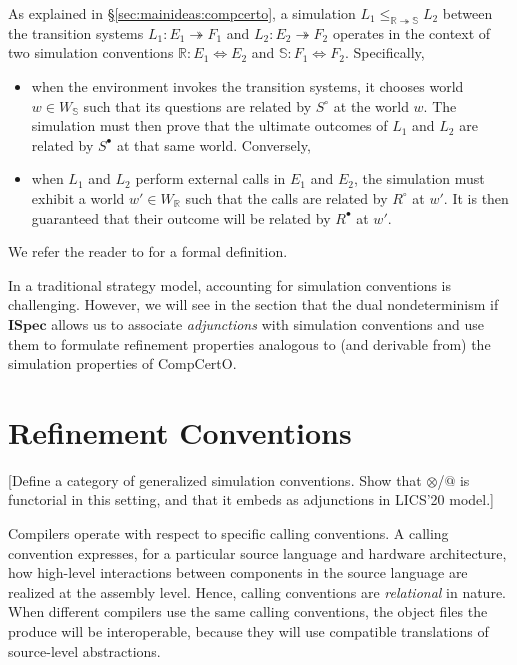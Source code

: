 \documentclass[sigplan,10pt,review,anonymous]{acmart}
\newcommand{\que}{{\circ}}
\newcommand{\ans}{{\bullet}}
\newcommand{\ISpec}{\mathbf{ISpec}}
\begin{document}
As explained in \S\ref{sec:mainideas:compcerto},
a simulation
$L_1 \le_{\mathbb{R} \twoheadrightarrow \mathbb{S}} L_2$
between the transition systems
$L_1 : E_1 \twoheadrightarrow F_1$ and
$L_2 : E_2 \twoheadrightarrow F_2$
operates in the context of two simulation conventions
$\mathbb{R} : E_1 \Leftrightarrow E_2$ and
$\mathbb{S} : F_1 \Leftrightarrow F_2$.
Specifically,
\begin{itemize}
\item
when the environment invokes the transition systems,
it chooses world $w \in W_\mathbb{S}$
such that its questions are related by $S^\que$ at the world $w$.
The simulation must then prove that
the ultimate outcomes of $L_1$ and $L_2$
are related by $S^\ans$ at that same world.
Conversely,
\item
when $L_1$ and $L_2$ perform external calls in $E_1$ and $E_2$,
the simulation must exhibit a world $w' \in W_\mathbb{R}$
such that the calls are related by $R^\que$ at $w'$.
It is then guaranteed that their outcome
will be related by $R^\ans$ at $w'$.
\end{itemize}
We refer the reader to \citet{compcerto}
for a formal definition.

In a traditional strategy model,
accounting for simulation conventions is challenging.
However,
we will see in the section that
the dual nondeterminism if $\ISpec$
allows us to associate \emph{adjunctions}
with simulation conventions
and use them to formulate refinement properties
analogous to (and derivable from)
the simulation properties of CompCertO.


\section{Refinement Conventions} \label{sec:refconv} %

[Define a category of generalized simulation conventions.
Show that $\otimes$/$@$ is functorial in this setting,
and that it embeds as adjunctions in LICS'20 model.]

Compilers operate with respect to specific calling conventions.
A calling convention expresses,
for a particular source language and hardware architecture,
how high-level interactions between components in the source language
are realized at the assembly level.
Hence, calling conventions are \emph{relational} in nature.
When different compilers use the same calling conventions,
the object files the produce will be interoperable,
because they will use compatible translations
of source-level abstractions.
\end{document}
